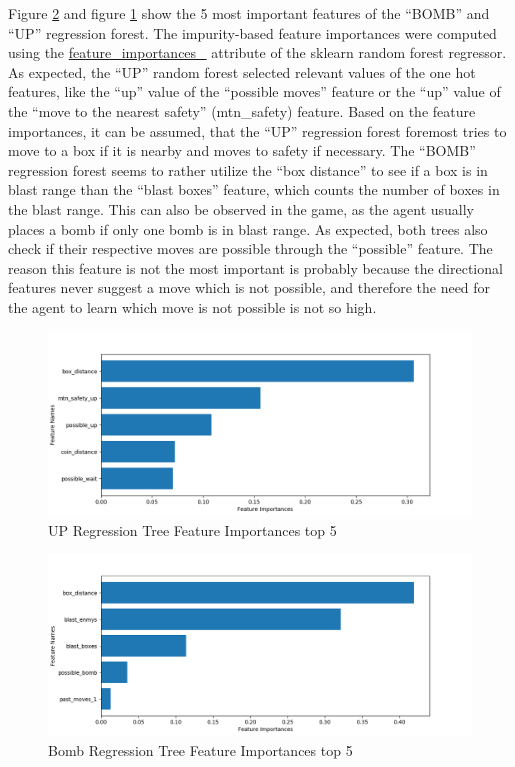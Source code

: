\documentclass{article}
\begin{document}
Figure \ref{bomb_feature_importances} and figure \ref{up_feature_importances} show the 5 most important features of the “BOMB” and “UP” regression forest. The impurity-based feature importances were computed using the \href{https://scikit-learn.org/stable/modules/generated/sklearn.ensemble.RandomForestRegressor.html#sklearn.ensemble.RandomForestRegressor.feature_importances_}{feature\_importances\_} attribute of the sklearn random forest regressor. As expected, the “UP” random forest selected relevant values of the one hot features, like the “up” value of the “possible moves” feature or the “up” value of the “move to the nearest safety” (mtn\_safety) feature. Based on the feature importances, it can be assumed, that the “UP” regression forest foremost tries to move to a box if it is nearby and moves to safety if necessary. The “BOMB” regression forest seems to rather utilize the “box distance” to see if a box is in blast range than the “blast boxes” feature, which counts the number of boxes in the blast range. This can also be observed in the game, as the agent usually places a bomb if only one bomb is in blast range. As expected, both trees also check if their respective moves are possible through the “possible” feature. The reason this feature is not the most important is probably because the directional features never suggest a move which is not possible, and therefore the need for the agent to learn which move is not possible is not so high.

\begin{figure}[h]
\includegraphics[width=\textwidth]{plots/UP_feature_importances.png}
\caption{UP Regression Tree Feature Importances top 5}
\label{up_feature_importances}
\end{figure}


\begin{figure}[h]
\includegraphics[width=\textwidth]{plots/BOMB_feature_importances.png}
\caption{Bomb Regression Tree Feature Importances top 5}
\label{bomb_feature_importances}
\end{figure}
\end{document}
